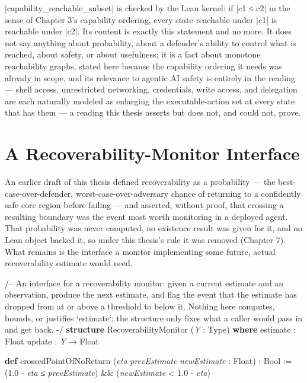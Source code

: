 \documentclass{memoir}
\begin{document}
\LeanVerb|capability_reachable_subset| is checked by the Lean kernel: if \LeanVerb|c1 ≤ c2|
in the sense of Chapter 3's capability ordering, every state reachable
under \LeanVerb|c1| is reachable under \LeanVerb|c2|. Its content is exactly this statement
and no more. It does not say anything about probability, about a defender's
ability to control what is reached, about safety, or about usefulness; it
is a fact about monotone reachability graphs, stated here because the
capability ordering it needs was already in scope, and its relevance to
agentic AI safety is entirely in the reading — shell access, unrestricted
networking, credentials, write access, and delegation are each naturally
modeled as enlarging the executable-action set at every state that has
them — a reading this thesis asserts but does not, and could not, prove.





\chapter{A Recoverability-Monitor Interface}\label{Capability--Monotonicity--in--a--Formal--Skeleton--for--Agentic--AI--Safety----A--Recoverability--Monitor--Interface}

An earlier draft of this thesis defined recoverability as a probability —
the best-case-over-defender, worst-case-over-adversary chance of returning
to a confidently safe core region before failing — and asserted, without
proof, that crossing a resulting boundary was the event most worth
monitoring in a deployed agent. That probability was never computed, no
existence result was given for it, and no Lean object backed it, so under
this thesis's rule it was removed (Chapter 7). What remains is the
interface a monitor implementing some future, actual recoverability
estimate would need.

\begin{LeanVerbatim}
/-- An interface for a recoverability monitor: given a current estimate and
an observation, produce the next estimate, and flag the event that the
estimate has dropped from at or above a threshold to below it. Nothing here
computes, bounds, or justifies `estimate`; the structure only fixes what a
caller would pass in and get back. -/
\textbf{structure} RecoverabilityMonitor (\textit{Y} : Type) \textbf{where}
  estimate : Float
  update   : \textit{Y} → Float

\textbf{def} crossedPointOfNoReturn (\textit{eta} \textit{prevEstimate} \textit{newEstimate} : Float) : Bool :=
  (1.0 - \textit{eta} ≤ \textit{prevEstimate}) && (\textit{newEstimate} < 1.0 - \textit{eta})

\end{LeanVerbatim}
\end{document}
